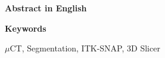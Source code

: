 
\newcommand*{\AbstractHead}[1]{%
{\noindent\color{header-blue}\Large\textbf{#1}}
\vspace{10pt}\\
}%

\newcommand*{\SomeSpace}{%
\vspace{\baselineskip}
}

\AbstractHead{Abstract in English}
\noindent
\normalsize
\begin{body}
\lipsum[1]
\end{body}
\SomeSpace
\AbstractHead{Keywords}
\label{s:Keywords}
\normalsize
\noindent
\begin{body}
$\mu$CT, Segmentation, ITK-SNAP, 3D Slicer
\end{body}
\glsresetall
\SomeSpace

\SomeSpace
\normalsize

\glsresetall
